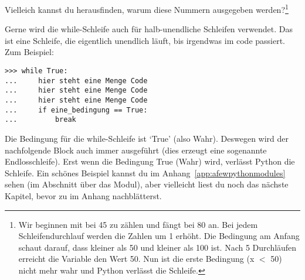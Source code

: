 Vielleich kannst du herausfinden, warum diese Nummern ausgegeben werden?\footnote{Wir beginnen mit  bei 45 zu zählen und  fängt bei 80 an. Bei jedem Schleifendurchlauf werden die Zahlen um 1 erhöht. Die Bedingung am Anfang schaut darauf, dass  kleiner als 50 und  kleiner als 100 ist. Nach 5 Durchläufen erreicht die Variable  den Wert 50. Nun ist die erste Bedingung (x $<$ 50) nicht mehr wahr und Python verlässt die Schleife.}

Gerne wird die while-Schleife auch für halb-unendliche Schleifen verwendet. Das ist eine Schleife, die eigentlich unendlich läuft, bis irgendwas im code passiert. Zum Beispiel:

\begin{listingignore}
\begin{verbatim}
>>> while True:
...     hier steht eine Menge Code
...     hier steht eine Menge Code
...     hier steht eine Menge Code
...     if eine_bedingung == True:
...         break
\end{verbatim}
\end{listingignore}
Die Bedingung für die while-Schleife ist `True' (also Wahr). Deswegen wird der nachfolgende Block auch immer ausgeführt (dies erzeugt eine sogenannte Endlosschleife). Erst wenn die Bedingung  True (Wahr) wird, verlässt Python die Schleife. Ein schönes Beispiel kannst du im Anhang~\ref{app:afewpythonmodules} sehen (im Abschnitt über das  Modul), aber vielleicht liest du noch das nächste Kapitel, bevor zu im Anhang nachblätterst.


